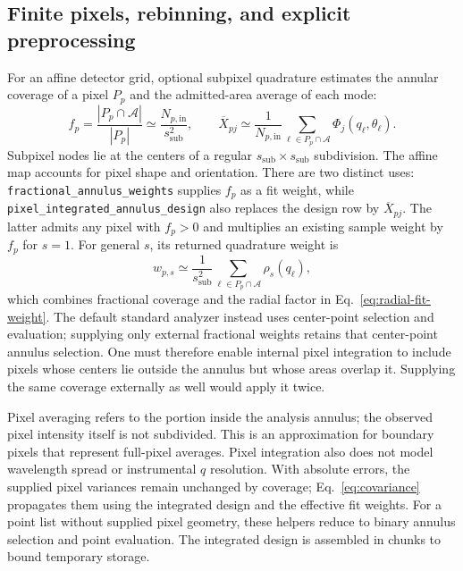 \documentclass[aps,prb,preprint,onecolumn,notitlepage,amsmath,amssymb,
  superscriptaddress,floatfix]{revtex4-2}
\newcommand{\Ann}{\mathcal{A}}
\begin{document}
\subsection{Finite pixels, rebinning, and explicit preprocessing}

For an affine detector grid, optional subpixel quadrature estimates the
annular coverage of a pixel $P_p$ and the admitted-area average of each mode:
\begin{equation}
 f_p=\frac{|P_p\cap\Ann|}{|P_p|}
 \simeq\frac{N_{p,\mathrm{in}}}{s_{\mathrm{sub}}^2},\qquad
 \overline X_{pj}\simeq
 \frac{1}{N_{p,\mathrm{in}}}
 \sum_{\ell\in P_p\cap\Ann}\Phi_j(q_\ell,\theta_\ell).
 \label{eq:pixel-integration}
\end{equation}
Subpixel nodes lie at the centers of a regular
$s_{\mathrm{sub}}\times s_{\mathrm{sub}}$ subdivision. The affine map
accounts for pixel shape and orientation. There are two distinct uses:
\texttt{fractional\_annulus\_weights} supplies $f_p$ as a fit weight, while
\texttt{pixel\_integrated\_annulus\_design} also replaces the design row by
$\overline X_{pj}$. The latter admits any pixel with $f_p>0$ and multiplies
an existing sample weight by $f_p$ for $s=1$. For general $s$, its returned
quadrature weight is
\begin{equation}
 w_{p,s}\simeq\frac{1}{s_{\mathrm{sub}}^2}
 \sum_{\ell\in P_p\cap\Ann}\rho_s(q_\ell),
 \label{eq:pixel-measure-weight}
\end{equation}
which combines fractional coverage and the radial factor in
Eq.~\eqref{eq:radial-fit-weight}. The default standard analyzer instead
uses center-point selection and evaluation; supplying only external
fractional weights retains that center-point annulus selection. One must
therefore enable internal pixel integration to include pixels whose centers
lie outside the annulus but whose areas overlap it. Supplying the same
coverage externally as well would apply it twice.

Pixel averaging refers to the portion inside the analysis annulus; the
observed pixel intensity itself is not subdivided. This is an approximation
for boundary pixels that represent full-pixel averages. Pixel integration
also does not model wavelength spread or instrumental $q$ resolution.
With absolute errors, the supplied pixel variances remain unchanged by
coverage; Eq.~\eqref{eq:covariance} propagates them using the integrated
design and the effective fit weights.
For a point list without supplied pixel geometry, these helpers reduce to
binary annulus selection and point evaluation. The integrated design is
assembled in chunks to bound temporary storage.
\end{document}
